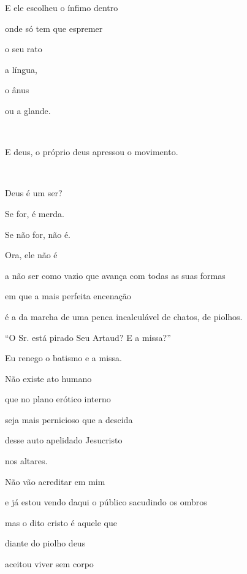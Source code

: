 E ele escolheu o ínfimo dentro

onde só tem que espremer


o seu rato

a língua, 

o ânus

ou a glande.

~

E deus, o próprio deus apressou o movimento.

~

Deus é um ser?

Se for, é merda.

Se não for, não é.

Ora, ele não é


a não ser como vazio que avança com todas as suas formas

em que a mais perfeita encenação

é a da marcha de uma penca incalculável de chatos, de piolhos.




``O Sr. está pirado Seu Artaud? E a missa?''


Eu renego o batismo e a missa.

Não existe ato humano \EP[1]

que no plano erótico interno


seja mais pernicioso que a descida

desse auto apelidado Jesucristo

nos altares.

Não vão acreditar em mim

e já estou vendo daqui o público sacudindo os ombros

mas o dito cristo é aquele que

diante do piolho deus

aceitou viver sem corpo

